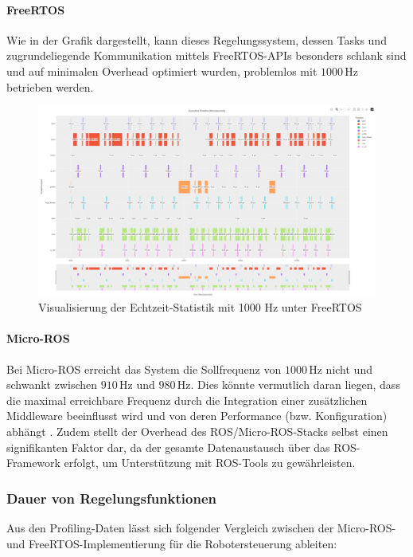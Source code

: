 \paragraph{FreeRTOS} Wie in der Grafik dargestellt, kann dieses Regelungssystem,
dessen Tasks und zugrundeliegende Kommunikation mittels FreeRTOS-APIs besonders
schlank sind und auf minimalen Overhead optimiert wurden, problemlos mit
$1000\,\text{Hz}$ betrieben werden.

\begin{figure}[H]
    \centering
    \includegraphics[width=1\textwidth]{assets/micro_ros_profiling_1000hz.png}
    \caption{Visualisierung der Echtzeit-Statistik mit 1000 Hz unter FreeRTOS}
\end{figure}

\paragraph{Micro-ROS} Bei Micro-ROS erreicht das System die Sollfrequenz von
$1000\,\text{Hz}$ nicht und schwankt zwischen $910\,\text{Hz}$ und
$980\,\text{Hz}$. Dies könnte vermutlich daran liegen, dass die maximal
erreichbare Frequenz durch die Integration einer zusätzlichen Middleware
beeinflusst wird und von deren Performance (bzw. Konfiguration) abhängt
\cite{ROS_Performance2019}. Zudem stellt der Overhead des ROS/Micro-ROS-Stacks
selbst einen signifikanten Faktor dar, da der gesamte Datenaustausch über das
ROS-Framework erfolgt, um Unterstützung mit ROS-Tools zu gewährleisten.

\subsubsection{Dauer von Regelungsfunktionen}

Aus den Profiling-Daten lässt sich folgender Vergleich zwischen der Micro-ROS-
und FreeRTOS-Implementierung für die Robotersteuerung ableiten:

